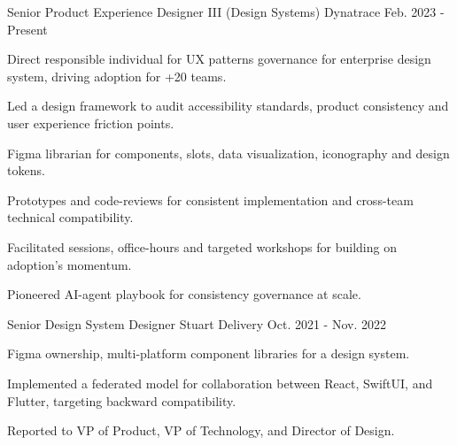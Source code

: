 

\begin{cventries}

  \cventry
    {Senior Product Experience Designer III (Design Systems)} %
    {Dynatrace} %
    {} %
    {Feb. 2023 - Present} %
    {
      \begin{cvitems} %
        \item {Direct responsible individual for UX patterns governance for enterprise design system, driving adoption for +20 teams.}
        \item {Led a design framework to audit accessibility standards, product consistency and user experience friction points.}
        \item {Figma librarian for components, slots, data visualization, iconography and design tokens.}
        \item {Prototypes and code-reviews for consistent implementation and cross-team technical compatibility.}
        \item {Facilitated sessions, office-hours and targeted workshops for building on adoption's momentum.}
        \item {Pioneered AI-agent playbook for consistency governance at scale.}
      \end{cvitems}
    }

  \cventry
    {Senior Design System Designer} %
    {Stuart Delivery} %
    {} %
    {Oct. 2021 - Nov. 2022} %
    {
      \begin{cvitems} %
        \item {Figma ownership, multi-platform component libraries for a design system.}
        \item {Implemented a federated model for collaboration between React, SwiftUI, and Flutter, targeting backward compatibility.}
        \item {Reported to VP of Product, VP of Technology, and Director of Design.}
      \end{cvitems}
    }


\end{cventries}
